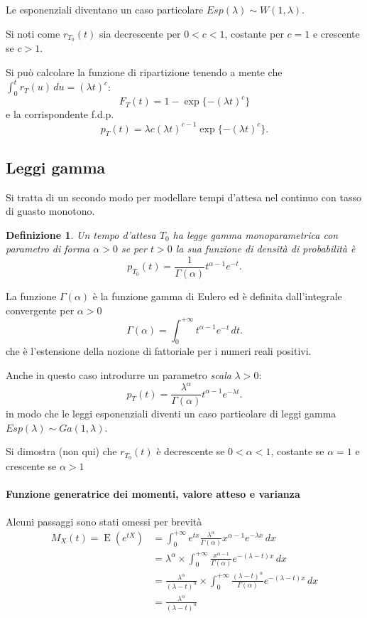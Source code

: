 \documentclass[11pt,a4paper,twoside]{article}
\newtheorem{definition}{Definizione}
\newcommand\dx{\,dx}
\newcommand\du{\,du}
\newcommand\dt{\,dt}
\DeclareMathOperator{\E}{E}
\begin{document}
Le esponenziali diventano un caso particolare \(Esp(\lambda) \sim W(1,
\lambda)\).

Si noti come \(r_{T_0}(t)\) sia decrescente per \(0 < c < 1\),
costante per \(c = 1\) e crescente se \(c > 1\).

Si può calcolare la funzione di ripartizione tenendo a mente che
\(\int_0^t r_T(u) \du = (\lambda t)^c\):
\[
  F_T(t) = 1 - \exp \{ -(\lambda t)^c \}
\]
e la corrispondente f.d.p.
\[
  p_T(t) = \lambda c (\lambda t)^{c-1} \exp\{ -(\lambda t)^c \} .
\]

\subsection{Leggi gamma}

Si tratta di un secondo modo per modellare tempi d'attesa nel continuo
con tasso di guasto monotono.

\begin{definition}
  Un tempo d'attesa \(T_0\) ha legge gamma monoparametrica con
  parametro di forma \(\alpha > 0\) se per \(t>0\) la sua funzione di
  densità di probabilità è
  \[
    p_{T_0}(t) = \frac 1{\Gamma(\alpha)} t^{\alpha-1}e^{-t} .
  \]
\end{definition}

La funzione \(\Gamma(\alpha)\) è la funzione gamma di Eulero ed è
definita dall'integrale convergente per \(\alpha > 0\)
\[
  \Gamma(\alpha) = \int_0^{+\infty} t^{\alpha -1}e^{-t} \dt.
\]
che è l'estensione della nozione di fattoriale per i numeri reali
positivi.

Anche in questo caso introdurre un parametro \textit{scala} \(\lambda
> 0\):
\[
  p_T(t) = \frac{\lambda^\alpha}{\Gamma(\alpha)} t^{\alpha -1}
  e^{-\lambda t} .
\]
in modo che le leggi esponenziali diventi un caso particolare di leggi
gamma \(Esp(\lambda) \sim Ga(1, \lambda)\).

Si dimostra (non qui) che \(r_{T_0}(t)\) è decrescente se \(0 < \alpha
< 1\), costante se \(\alpha = 1\) e crescente se \(\alpha > 1\)

\paragraph{Funzione generatrice dei momenti, valore atteso e varianza}
Alcuni passaggi sono stati omessi per brevità
\begin{align*}
  M_X(t) = \E(e^{tX})
  &= \int_0^{+\infty} e^{tx} \frac{\lambda^\alpha}{\Gamma(\alpha)} x^{\alpha -1} e^{-\lambda x} \dx \\
  &= \lambda^\alpha \times
    \int_0^{+\infty} \frac{x^{\alpha-1}}{\Gamma(\alpha)} e^{-(\lambda -t) x} \dx \\
  &= \frac{\lambda^\alpha}{(\lambda -t)^\alpha} \times
    \int_0^{+\infty} \frac{(\lambda -t)^\alpha}{\Gamma(\alpha)} e^{-(\lambda-t)x} \dx \\
  &= \frac{\lambda^\alpha}{(\lambda -t)^\alpha}
\end{align*}
\end{document}

